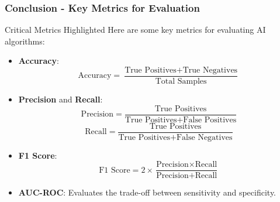 \documentclass[aspectratio=169]{beamer}
\begin{document}
\begin{frame}[fragile]
    \frametitle{Conclusion - Key Metrics for Evaluation}
    \begin{block}{Critical Metrics Highlighted}
        Here are some key metrics for evaluating AI algorithms:
    \end{block}
    \begin{itemize}
        \item \textbf{Accuracy}:
        \begin{equation}
            \text{Accuracy} = \frac{\text{True Positives} + \text{True Negatives}}{\text{Total Samples}}
        \end{equation}
        
        \item \textbf{Precision} and \textbf{Recall}:
        \begin{equation}
            \text{Precision} = \frac{\text{True Positives}}{\text{True Positives} + \text{False Positives}}
        \end{equation}
        \begin{equation}
            \text{Recall} = \frac{\text{True Positives}}{\text{True Positives} + \text{False Negatives}}
        \end{equation}
        
        \item \textbf{F1 Score}:
        \begin{equation}
            \text{F1 Score} = 2 \times \frac{\text{Precision} \times \text{Recall}}{\text{Precision} + \text{Recall}}
        \end{equation}
        
        \item \textbf{AUC-ROC}: Evaluates the trade-off between sensitivity and specificity.
    \end{itemize}
\end{frame}
\end{document}
